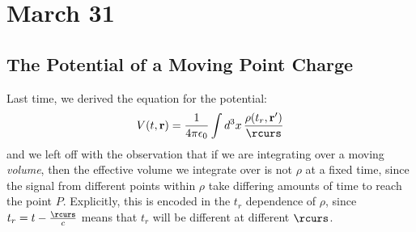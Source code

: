 \section{March 31}

\subsection{The Potential of a Moving Point Charge}
Last time, we derived the equation for the potential:
\[
	V(t, \mathbf{r}) = \frac{1}{4 \pi \epsilon_0} \int d^3x \, \frac{\rho(t_r, \mathbf{r}')}{\rcurs}
\]
and we left off with the observation that if we are integrating over a moving \textit{volume}, then
the effective volume we integrate over is not \( \rho \) at a fixed time, since the signal from different
points within \( \rho \) take differing amounts of time to reach the point \( P \). Explicitly, this is
encoded in the \( t_r \) dependence of \( \rho \), since \( t_r = t - \frac{\rcurs}{c} \) means that \( t_r
\) will be different at different \( \rcurs \). 
 
